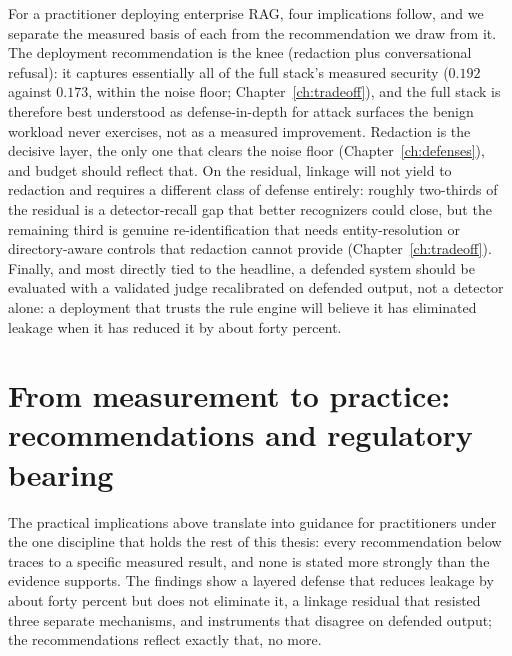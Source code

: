 For a practitioner deploying enterprise RAG, four implications follow, and we separate the
measured basis of each from the recommendation we draw from it. The deployment recommendation is
the knee (redaction plus conversational refusal): it captures essentially all of the full
stack's measured security ($0.192$ against $0.173$, within the noise floor;
Chapter~\ref{ch:tradeoff}), and the full stack is therefore best understood as
defense-in-depth for attack surfaces the benign workload never exercises, not as a measured
improvement. Redaction is the decisive layer, the only one that clears the noise
floor (Chapter~\ref{ch:defenses}), and budget should reflect that. On the residual, linkage
will not yield to redaction and requires a different class of defense entirely:
roughly two-thirds of the residual is a detector-recall gap that better recognizers could close,
but the remaining third is genuine re-identification that needs entity-resolution or
directory-aware controls that redaction cannot provide (Chapter~\ref{ch:tradeoff}). Finally, and
most directly tied to the headline, a defended system should be evaluated with a
validated judge recalibrated on defended output, not a detector alone: a deployment that trusts
the rule engine will believe it has eliminated leakage when it has reduced it by about forty
percent.

\section{From measurement to practice: recommendations and regulatory bearing}
\label{sec:disc-recommendations}

The practical implications above translate into guidance for practitioners under the one discipline that
holds the rest of this thesis: every recommendation below traces to a specific measured result, and none
is stated more strongly than the evidence supports. The findings show a layered defense that reduces
leakage by about forty percent but does not eliminate it, a linkage residual that resisted three separate
mechanisms, and instruments that disagree on defended output; the recommendations reflect exactly
that, no more.

